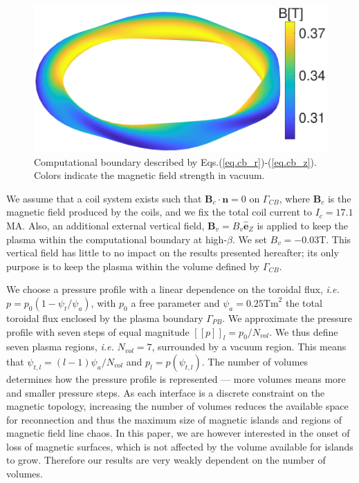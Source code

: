 \documentclass[my_thesis.tex]{subfiles}
\begin{document}
\begin{figure}
	\centering
	\includegraphics[width=.7\linewidth]{images/ClassicalStellaratorBetaLimit/ComputationalBoundary_modB.pdf}
	\caption{Computational boundary described by Eqs.(\ref{eq.cb_r})-(\ref{eq.cb_z}). Colors indicate the magnetic field strength in vacuum.}
	\label{fig. modB boundary}
\end{figure}

We assume that a coil system exists such that $\mathbf{B}_c\cdot\mathbf{n}=0$ on $\Gamma_{CB}$, where $\mathbf{B}_c$ is the magnetic field produced by the coils, and we fix the total coil current to $I_c=17.1$MA.
Also, an additional external vertical field, $\mathbf{B}_v=B_v\mathbf{\hat{e}}_Z$ is applied to keep the plasma within the computational boundary at high-$\beta$. We set $B_v=-0.03$T. This vertical field has little to no impact on the results presented hereafter; its only purpose is to keep the plasma within the volume defined by $\Gamma_{CB}$. 


We choose a pressure profile with a linear dependence on the toroidal flux, \textit{i.e.} $p=p_0(1-\psi_t/\psi_a)$, with $p_0$ a free parameter and $\psi_a=0.25\text{Tm}^2$ the total toroidal flux enclosed by the plasma boundary $\Gamma_{PB}$. We approximate the pressure profile with seven steps of equal magnitude $[[p]]_l=p_0/N_{vol}$. We thus define seven plasma regions, \textit{i.e.} $N_{vol}=7$, surrounded by a vacuum region. This means that $\psi_{t,l}=(l-1)\psi_a / N_{vol}$ and $p_l=p(\psi_{t,l})$. The number of volumes determines how the pressure profile is represented --- more volumes means more and smaller pressure steps. As each interface is a discrete constraint on the magnetic topology, increasing the number of volumes reduces the available space for reconnection and thus the maximum size of magnetic islands and regions of magnetic field line chaos.  In this paper, we are however interested in the onset of loss of magnetic surfaces, which is not affected by the volume available for islands to grow. Therefore our results are very weakly dependent on the number of volumes.
\end{document}
